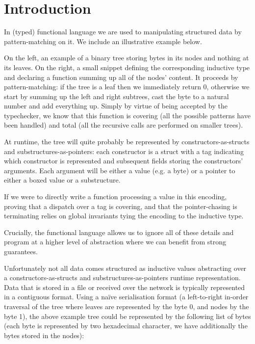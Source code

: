 \section{Introduction}

In (typed) functional language we are used to manipulating
structured data by pattern-matching on it.
We include an illustrative example below.

\begin{minipage}{.5\textwidth}

\end{minipage}\hfill
\begin{minipage}{.45\textwidth}
\end{minipage}

On the left, an example of a binary tree storing bytes in its nodes and
nothing at its leaves.
%
On the right, a small \idris{} snippet defining the corresponding
inductive type and declaring a function summing up all of the
nodes' content.
%
It proceeds by pattern-matching:
%
if the tree is a leaf then we immediately return 0,
otherwise we start by summing up the left and right subtrees, cast the
byte to a natural number and add everything up.
%
Simply by virtue of being accepted by the typechecker, we know that
this function is covering (all the possible patterns have been handled)
and total (all the recursive calls are performed on smaller trees).

At runtime, the tree will quite probably be represented by
constructors-as-structs and substructures-as-pointers:
%
each constructor is a struct with a tag indicating which
constructor is represented and subsequent fields storing
the constructors' arguments.
%
Each argument will be either a value (e.g. a byte) or a pointer
to either a boxed value or a substructure.

If we were to directly write a function processing a value in this
encoding, proving that a dispatch over a tag is covering, and that
the pointer-chasing is terminating relies on global invariants
tying the encoding to the inductive type.

Crucially, the functional language allows us to ignore all of these
details and program at a higher level of abstraction where we can
benefit from strong guarantees.

Unfortunately not all data comes structured as inductive values
abstracting over a constructors-as-structs and substructures-as-pointers
runtime representation.
%
Data that is stored in a file or received over the network is typically
represented in a contiguous format.
%
Using a naïve serialisation format (a left-to-right in-order traversal
of the tree where leaves are represented by the byte 0, and nodes by
the byte 1), the above example tree could be represented by the
following list of bytes
(each byte is represented by two hexadecimal character,
we have additionally  the bytes stored in the nodes):

